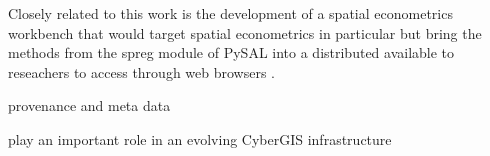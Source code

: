 \documentclass[11pt, titlepage]{article}
\begin{document}
Closely related to this work is the development of a spatial
econometrics workbench \citep{Anselin:2011wt} that would target spatial econometrics in
particular but bring the methods from the spreg module of PySAL into a
distributed available to reseachers to access through web browsers .

provenance and meta data

play an important role in an evolving CyberGIS infrastructure


%

\end{document}
